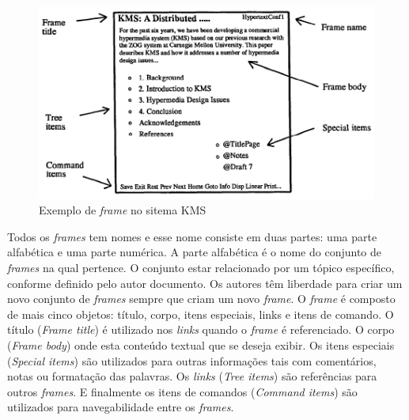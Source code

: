 \begin{figure}[h!]
    \centering
    \includegraphics[scale=0.6,keepaspectratio=true]{figuras/FrameKMS.png}
    \caption{Exemplo de \textit{frame} no sitema KMS \cite{akscyn1987kms}}
    \label{fig:frameKMS}
\end{figure}

Todos os \textit{frames} tem nomes e esse nome consiste em duas partes: uma parte alfabética e uma parte numérica. A parte alfabética é o nome do conjunto de \textit{frames} na qual pertence. O conjunto estar relacionado por um tópico específico, conforme definido pelo autor documento. Os autores têm liberdade para criar um novo conjunto de \textit{frames} sempre que criam um novo \textit{frame}. O \textit{frame} é composto de mais cinco objetos: título, corpo, itens especiais, links e itens de comando. O título (\textit{Frame title}) é utilizado nos \textit{links} quando o \textit{frame} é referenciado. O corpo (\textit{Frame body}) onde esta conteúdo textual que se deseja exibir. Os itens especiais (\textit{Special items}) são utilizados para outras informações tais com comentários, notas ou formatação das palavras. Os \textit{links} (\textit{Tree items}) são referências para outros \textit{frames}. E finalmente os itens de comandos (\textit{Command items}) são utilizados para navegabilidade entre os \textit{frames}. 

